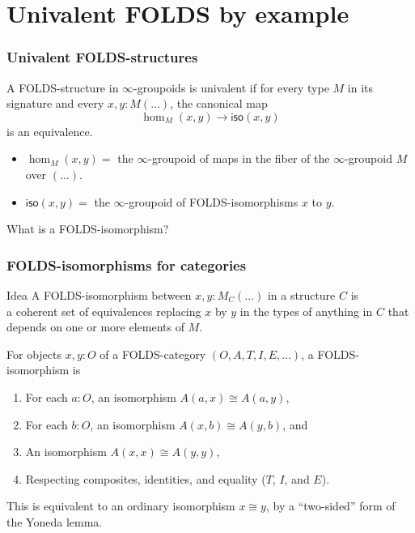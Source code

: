\documentclass{beamer}
\begin{document}
\section{Univalent FOLDS by example}
\label{sec:univalent-folds-eg}

\begin{frame}
  \frametitle{Univalent FOLDS-structures}
  \begin{definition}
    A FOLDS-structure in $\infty$-groupoids is \alert<1>{univalent} if for every type $M$ in its signature and every $x,y:M(\dots)$, the canonical map
    \[ \hom_M(x,y) \to \mathsf{iso}(x,y) \]
    is an equivalence.
  \end{definition}
  \pause
  \begin{itemize}
  \item $\hom_M(x,y)=$ the $\infty$-groupoid of maps in the fiber of the $\infty$-groupoid $M$ over $(\dots)$.
  \item $\mathsf{iso}(x,y)=$ the $\infty$-groupoid of \alert{FOLDS-isomorphisms} $x$ to $y$.
  \end{itemize}
  What is a FOLDS-isomorphism?
\end{frame}

\begin{frame}
  \frametitle{FOLDS-isomorphisms for categories}
  \begin{block}{Idea}
    A FOLDS-isomorphism between $x,y:M_C(\dots)$ in a structure $C$ is\\\alert<1>{a coherent set of equivalences replacing $x$ by $y$ in the types of anything in $C$ that depends on one or more elements of $M$}.
  \end{block}
  \pause
  For objects $x,y:O$ of a FOLDS-category $(O,A,T,I,E,\dots)$, a FOLDS-isomorphism is
  \begin{enumerate}
  \item For each $a:O$, an isomorphism $A(a,x) \cong A(a,y)$,
  \item For each $b:O$, an isomorphism $A(x,b) \cong A(y,b)$, and
  \item An isomorphism $A(x,x) \cong A(y,y)$,
  \item Respecting composites, identities, and equality ($T$, $I$, and $E$).
  \end{enumerate}
  \pause
  This is equivalent to an ordinary isomorphism $x\cong y$, by a ``two-sided'' form of the Yoneda lemma.
\end{frame}
\end{document}
